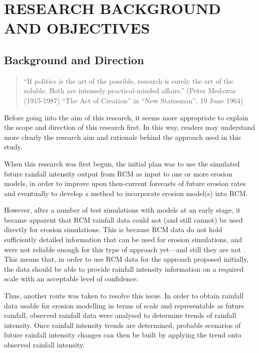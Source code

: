 \chapter{RESEARCH BACKGROUND AND OBJECTIVES}
\label{sec:RESEARCHOBJECTIVES}

\section{Background and Direction}
\label{sec:ResearchBackgroundandDirection}

\begin{quotation}
\small ``If politics is the art of the possible, research is surely the art of
the soluble. Both are intensely practical-minded affairs.'' (Peter Medawar
(1915-1987) ``The Act of Creation'' in ``New Statesman'', 19 June 1964)
\end{quotation}

Before going into the aim of this research, it seems more appropriate to explain
the scope and direction of this research first. In this way, readers may
understand more clearly the research aim and rationale behind the approach used
in this study.

When this research was first begun, the initial plan was to use the simulated
future rainfall intensity output from RCM as input to one or more erosion
models, in order to improve upon then-current forecasts of future erosion rates
and eventually to develop a method to incorporate erosion model(s) into RCM.

However, after a number of test simulations with models at an early stage, it
became apparent that RCM rainfall data could not (and still cannot) be used
directly for erosion simulations. This is because RCM data do not hold
sufficiently detailed information that can be used for erosion simulations, and
were not reliable enough for this type of approach yet---and still they are
not \citep{nearing2001-229,michael2005-155,o'neal2005-165}. This means that, in
order to use RCM data for the approach proposed initially, the data should be
able to provide rainfall intensity information on a required scale with an
acceptable level of confidence.

Thus, another route was taken to resolve this issue. In order to obtain rainfall
data usable for erosion modelling in terms of scale and representable as
future rainfall, observed rainfall data were analysed to determine trends of
rainfall intensity. Once rainfall intensity trends are determined, probable
scenarios of future rainfall intensity changes can then be built by applying the
trend onto observed rainfall intensity.

